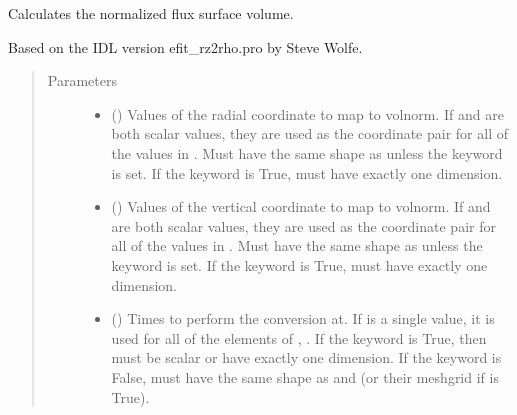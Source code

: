 \documentclass[letterpaper,10pt,english]{sphinxmanual}
\begin{document}
\begin{fulllineitems}
\begin{fulllineitems}
\label{\detokenize{eqtools:eqtools.core.Equilibrium.rz2volnorm}}
Calculates the normalized flux surface volume.

Based on the IDL version efit\_rz2rho.pro by Steve Wolfe.
\begin{quote}\begin{description}
\item[{Parameters}] \leavevmode\begin{itemize}
\item {} 
 () \textendash{} Values of the radial coordinate to
map to volnorm. If  and  are both scalar values,
they are used as the coordinate pair for all of the values in
. Must have the same shape as  unless the 
keyword is set. If the  keyword is True,  must
have exactly one dimension.

\item {} 
 () \textendash{} Values of the vertical coordinate to
map to volnorm. If  and  are both scalar values,
they are used as the coordinate pair for all of the values in
. Must have the same shape as  unless the 
keyword is set. If the  keyword is True,  must
have exactly one dimension.

\item {} 
 () \textendash{} Times to perform the conversion at.
If  is a single value, it is used for all of the elements of
, . If the  keyword is True, then  must be
scalar or have exactly one dimension. If the  keyword is
False,  must have the same shape as  and  (or their
meshgrid if  is True).


\end{itemize}
\end{description}
\end{quote}
\end{fulllineitems}
\end{fulllineitems}
\end{document}
